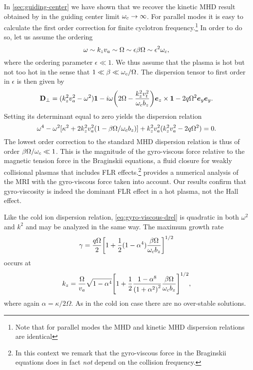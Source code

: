 \documentclass[aps,pre,notitlepage,amsmath,amssymb,amsfonts,nobibnotes,nofootinbib,superscriptaddress]{revtex4-1}
\begin{document}
In \cref{sec:guiding-center} we have shown that we recover the kinetic MHD
result obtained by \citet{Quataert2002} in the guiding center limit
$\omega_c\to\infty$. For parallel modes it is easy to calculate the first order
correction for finite cyclotron frequency.\footnote{Note that for parallel
  modes the MHD and kinetic MHD dispersion relations are identical} In order
to do so, let us assume the ordering
\begin{equation}
  \label{eq:ordering}
  \omega\sim k_z\va\sim\Omega\sim\epsilon\beta\Omega
  \sim\epsilon^2\omc,
\end{equation}
where the ordering parameter $\epsilon\ll1$. We thus assume that the plasma is
hot but not too hot in the sense that $1\ll\beta\ll\omega_c/\Omega$. The
dispersion tensor to first order in $\epsilon$ is then given by
\begin{equation}
  \label{eq:gyro-viscous-drel}
  \mathbf{D}_\perp = (k_z^2\va^2 - \omega^2)\mathbf{1} - i\omega\left(
    2\Omega - \frac{k_z^2\vt^2}{\omc b_z}
  \right)\ez\times\mathbf{1} - 2q\Omega^2\ey\ey.
\end{equation}
Setting its determinant equal to zero yields the dispersion relation
\begin{equation}
  \omega^4
  - \omega^2[\kappa^2 + 2k_z^2\va^2\left(1 - \beta\Omega/\omc b_z\right)]
  + k_z^2\va^2(k_z^2\va^2 - 2q\Omega^2) = 0.
\end{equation}
The lowest order correction to the standard MHD dispersion relation is thus of
order $\beta\Omega/\omega_c\ll{}1$. This is the magnitude of the gyro-viscous
force relative to the magnetic tension force in the Braginskii equations, a
fluid closure for weakly collisional plasmas that includes FLR
effects.\footnote{In this context we remark that the gyro-viscous force in the
  Braginskii equations does in fact \emph{not} depend on the collision
  frequency.} \citet{Ferraro2007} provides a numerical analysis of the MRI
with the gyro-viscous force taken into account. Our results confirm that
gyro-viscosity is indeed the dominant FLR effect in a hot plasma, not the Hall
effect.

Like the cold ion dispersion relation, \cref{eq:gyro-viscous-drel} is
quadratic in both $\omega^2$ and $k^2$ and may be analyzed in the same way.
The maximum growth rate
\begin{equation}
  \label{eq:maximum-growth-rate}
  \gamma = \frac{q\Omega}{2}{\left[
    1 + \frac{1}{2}(1-\alpha^4)\frac{\beta\Omega}{\omc b_z}
  \right]}^{1/2}
\end{equation}
occurs at
\begin{equation}
  \label{eq:optimal-wave-number}
  k_z = \frac{\Omega}{\va}\sqrt{1-\alpha^4}{\left[
    1 + \frac{1}{2}\frac{1-\alpha^8}{{(1+\alpha^2)}^2}
    \frac{\beta\Omega}{\omc b_z}
  \right]}^{1/2},
\end{equation}
where again $\alpha=\kappa/2\Omega$. As in the cold ion case there are no
over-stable solutions. 
\end{document}
